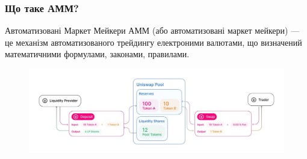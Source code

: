 \documentclass[beamer]{standalone}%
\begin{document}
\begin{frame}\frametitle{Що таке АММ?}
  \begin{block}{Автоматизовані Маркет Мейкери}
    АММ (або автоматизовані маркет мейкери) --- це механізм автоматизованого
    трейдингу електроними валютами, що визначений математичними формулами,
    законами, правилами.
  \end{block}

  \begin{figure}
    \includegraphics[scale=0.2]{./presentation/images/amm-intro-example.jpeg}
  \end{figure}
\end{frame}
\end{document}
